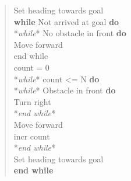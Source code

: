 \begin{quote}
Set heading towards goal\\
\textbf{while} Not arrived at goal \textbf{do}\\
\hspace*{0.333em}\hspace*{0.333em}*\emph{while}* No obstacle in front
\textbf{do}\\
\hspace*{0.333em}\hspace*{0.333em}\hspace*{0.333em}\hspace*{0.333em}Move
forward\\
\hspace*{0.333em}\hspace*{0.333em}end while\\
\hspace*{0.333em}\hspace*{0.333em}count = 0\\
\hspace*{0.333em}\hspace*{0.333em}*\emph{while}* count \textless= N
\textbf{do}\\
\hspace*{0.333em}\hspace*{0.333em}\hspace*{0.333em}\hspace*{0.333em}*\emph{while}*
Obstacle in front \textbf{do}\\
\hspace*{0.333em}\hspace*{0.333em}\hspace*{0.333em}\hspace*{0.333em}\hspace*{0.333em}\hspace*{0.333em}Turn
right\\
\hspace*{0.333em}\hspace*{0.333em}\hspace*{0.333em}\hspace*{0.333em}*\emph{end
while}*\\
\hspace*{0.333em}\hspace*{0.333em}\hspace*{0.333em}\hspace*{0.333em}Move
forward\\
\hspace*{0.333em}\hspace*{0.333em}\hspace*{0.333em}\hspace*{0.333em}incr
count\\
\hspace*{0.333em}\hspace*{0.333em}*\emph{end while}*\\
\hspace*{0.333em}\hspace*{0.333em}Set heading towards goal\\
\textbf{end while}


\end{quote}
